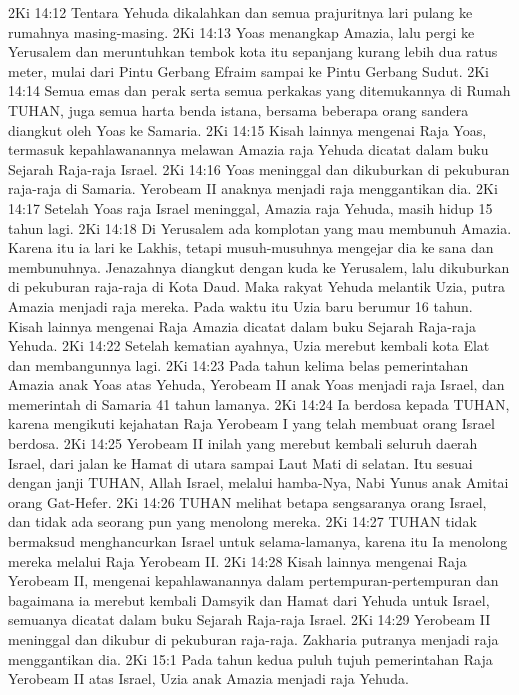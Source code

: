 2Ki 14:12  Tentara Yehuda dikalahkan dan semua prajuritnya lari pulang ke rumahnya masing-masing.
2Ki 14:13  Yoas menangkap Amazia, lalu pergi ke Yerusalem dan meruntuhkan tembok kota itu sepanjang kurang lebih dua ratus meter, mulai dari Pintu Gerbang Efraim sampai ke Pintu Gerbang Sudut.
2Ki 14:14  Semua emas dan perak serta semua perkakas yang ditemukannya di Rumah TUHAN, juga semua harta benda istana, bersama beberapa orang sandera diangkut oleh Yoas ke Samaria.
2Ki 14:15  Kisah lainnya mengenai Raja Yoas, termasuk kepahlawanannya melawan Amazia raja Yehuda dicatat dalam buku Sejarah Raja-raja Israel.
2Ki 14:16  Yoas meninggal dan dikuburkan di pekuburan raja-raja di Samaria. Yerobeam II anaknya menjadi raja menggantikan dia.
2Ki 14:17  Setelah Yoas raja Israel meninggal, Amazia raja Yehuda, masih hidup 15 tahun lagi.
2Ki 14:18  Di Yerusalem ada komplotan yang mau membunuh Amazia. Karena itu ia lari ke Lakhis, tetapi musuh-musuhnya mengejar dia ke sana dan membunuhnya. Jenazahnya diangkut dengan kuda ke Yerusalem, lalu dikuburkan di pekuburan raja-raja di Kota Daud. Maka rakyat Yehuda melantik Uzia, putra Amazia menjadi raja mereka. Pada waktu itu Uzia baru berumur 16 tahun. Kisah lainnya mengenai Raja Amazia dicatat dalam buku Sejarah Raja-raja Yehuda.
2Ki 14:22  Setelah kematian ayahnya, Uzia merebut kembali kota Elat dan membangunnya lagi.
2Ki 14:23  Pada tahun kelima belas pemerintahan Amazia anak Yoas atas Yehuda, Yerobeam II anak Yoas menjadi raja Israel, dan memerintah di Samaria 41 tahun lamanya.
2Ki 14:24  Ia berdosa kepada TUHAN, karena mengikuti kejahatan Raja Yerobeam I yang telah membuat orang Israel berdosa.
2Ki 14:25  Yerobeam II inilah yang merebut kembali seluruh daerah Israel, dari jalan ke Hamat di utara sampai Laut Mati di selatan. Itu sesuai dengan janji TUHAN, Allah Israel, melalui hamba-Nya, Nabi Yunus anak Amitai orang Gat-Hefer.
2Ki 14:26  TUHAN melihat betapa sengsaranya orang Israel, dan tidak ada seorang pun yang menolong mereka.
2Ki 14:27  TUHAN tidak bermaksud menghancurkan Israel untuk selama-lamanya, karena itu Ia menolong mereka melalui Raja Yerobeam II.
2Ki 14:28  Kisah lainnya mengenai Raja Yerobeam II, mengenai kepahlawanannya dalam pertempuran-pertempuran dan bagaimana ia merebut kembali Damsyik dan Hamat dari Yehuda untuk Israel, semuanya dicatat dalam buku Sejarah Raja-raja Israel.
2Ki 14:29  Yerobeam II meninggal dan dikubur di pekuburan raja-raja. Zakharia putranya menjadi raja menggantikan dia.
2Ki 15:1  Pada tahun kedua puluh tujuh pemerintahan Raja Yerobeam II atas Israel, Uzia anak Amazia menjadi raja Yehuda.
